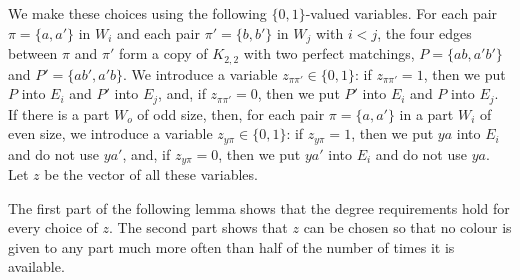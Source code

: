 We make these choices using the following $\{0,1\}$-valued variables.
For each pair $\pi=\{a,a'\}$ in $W_i$ and each pair $\pi'=\{b,b'\}$ in $W_j$ with $i<j$, the four edges between $\pi$ and $\pi'$ form a copy of $K_{2,2}$ with two perfect matchings, $P=\{ab,a'b'\}$ and $P'=\{ab',a'b\}$. We introduce a variable $z_{\pi\pi'}\in\{0,1\}$: if $z_{\pi\pi'}=1$, then we put $P$ into $E_i$ and $P'$ into $E_j$, and, if $z_{\pi\pi'}=0$, then we put $P'$ into $E_i$ and $P$ into $E_j$.
If there is a part $W_o$ of odd size, then, for each pair $\pi=\{a,a'\}$ in a part $W_i$ of even size, we introduce a variable $z_{y\pi}\in\{0,1\}$: if $z_{y\pi}=1$, then we put $ya$ into $E_i$ and do not use $ya'$, and, if $z_{y\pi}=0$, then we put $ya'$ into $E_i$ and do not use $ya$.
Let $z$ be the vector of all these variables.

The first part of the following lemma shows that the degree requirements hold for every choice of $z$. The second part shows that $z$ can be chosen so that no colour is given to any part much more often than half of the number of times it is available.

